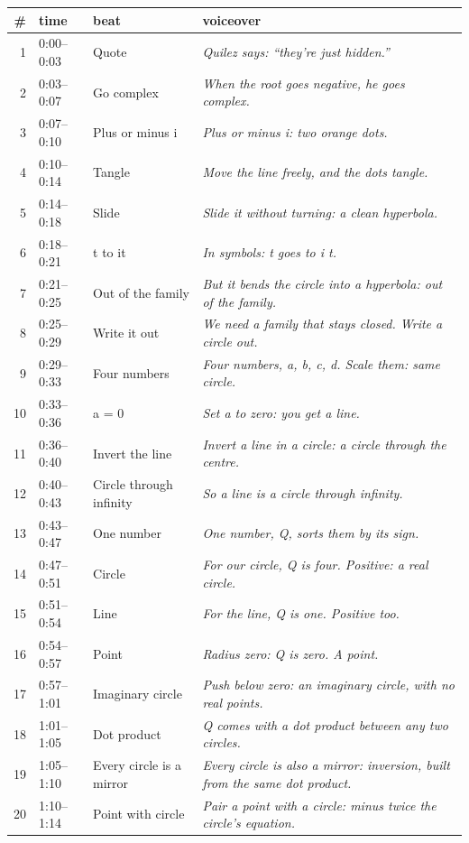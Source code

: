 \documentclass[10pt]{article}
\begin{document}
{\scriptsize\begin{longtable}{rllp{}}\toprule \# & time & beat & voiceover\\\midrule
1 & 0:00--0:03 & Quote & \emph{Quilez says: ``they're just hidden.''}\\
2 & 0:03--0:07 & Go complex & \emph{When the root goes negative, he goes complex.}\\
3 & 0:07--0:10 & Plus or minus i & \emph{Plus or minus i: two orange dots.}\\
4 & 0:10--0:14 & Tangle & \emph{Move the line freely, and the dots tangle.}\\
5 & 0:14--0:18 & Slide & \emph{Slide it without turning: a clean hyperbola.}\\
6 & 0:18--0:21 & t to it & \emph{In symbols: t goes to i t.}\\
7 & 0:21--0:25 & Out of the family & \emph{But it bends the circle into a hyperbola: out of the family.}\\
8 & 0:25--0:29 & Write it out & \emph{We need a family that stays closed. Write a circle out.}\\
9 & 0:29--0:33 & Four numbers & \emph{Four numbers, a, b, c, d. Scale them: same circle.}\\
10 & 0:33--0:36 & a = 0 & \emph{Set a to zero: you get a line.}\\
11 & 0:36--0:40 & Invert the line & \emph{Invert a line in a circle: a circle through the centre.}\\
12 & 0:40--0:43 & Circle through infinity & \emph{So a line is a circle through infinity.}\\
13 & 0:43--0:47 & One number & \emph{One number, Q, sorts them by its sign.}\\
14 & 0:47--0:51 & Circle & \emph{For our circle, Q is four. Positive: a real circle.}\\
15 & 0:51--0:54 & Line & \emph{For the line, Q is one. Positive too.}\\
16 & 0:54--0:57 & Point & \emph{Radius zero: Q is zero. A point.}\\
17 & 0:57--1:01 & Imaginary circle & \emph{Push below zero: an imaginary circle, with no real points.}\\
18 & 1:01--1:05 & Dot product & \emph{Q comes with a dot product between any two circles.}\\
19 & 1:05--1:10 & Every circle is a mirror & \emph{Every circle is also a mirror: inversion, built from the same dot product.}\\
20 & 1:10--1:14 & Point with circle & \emph{Pair a point with a circle: minus twice the circle's equation.}\\

\end{longtable}}
\end{document}
